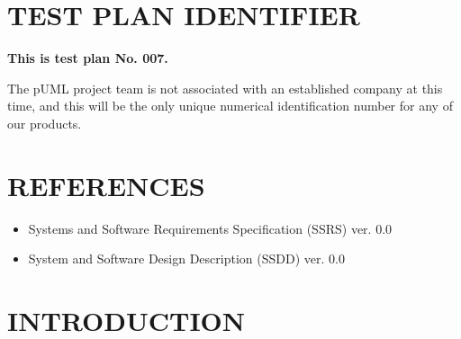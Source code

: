 \documentclass[twoside,letterpaper]{article}
\begin{document}
\setcounter{page}{1}\pagestyle{Convertiv}

\clearpage

\section[IDENTIFIER]{\bfseries TEST PLAN IDENTIFIER}

{\bfseries This is test plan No. 007. } 

\bigskip

The pUML project team is not associated with an established company at this time, and this will be the only unique numerical identification number for any of our products.

\section[REFERENCES]{\bfseries REFERENCES}

\begin{itemize}
\item   Systems and Software Requirements Specification (SSRS) ver. 0.0
\item   System and Software Design Description (SSDD) ver. 0.0
\end{itemize}

\section[INTRODUCTION]{\bfseries INTRODUCTION}

\end{document}
